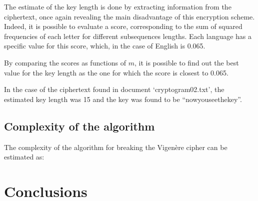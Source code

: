 \documentclass[12pt]{article}
\begin{document}
The estimate of the key length is done by extracting information from the ciphertext, once again revealing the main disadvantage of this encryption scheme.
Indeed, it is possible to evaluate a score, corresponding to the sum of squared frequencies of each letter for different subsequences lengths.
Each language has a specific value for this score, which, in the case of English is 0.065.

By comparing the scores as functions of $m$, it is possible to find out the best value for the key length as the one for which the score is closest to 0.065.

In the case of the ciphertext found in document `cryptogram02.txt', the estimated key length was 15 and the key was found to be ``nowyouseethekey''.

\subsection{Complexity of the algorithm}

The complexity of the algorithm for breaking the Vigenère cipher can be estimated as:

%

\section{Conclusions}


\pagebreak
\end{document}
